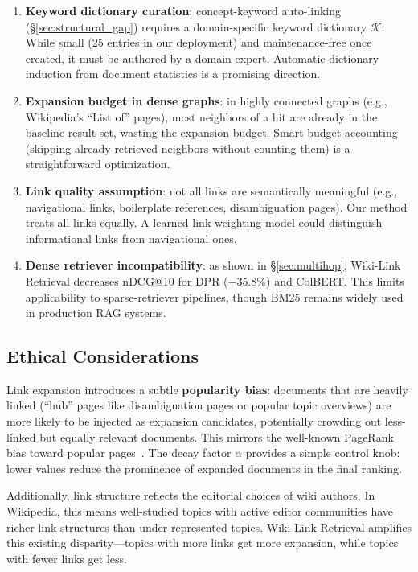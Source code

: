 \documentclass[sigconf,review]{acmart}
\newcommand{\sys}{Wiki-Link Retrieval\xspace}
\begin{document}
\begin{enumerate}
  \item \textbf{Keyword dictionary curation}: concept-keyword auto-linking (\S\ref{sec:structural_gap}) requires a domain-specific keyword dictionary $\mathcal{K}$.  While small (25 entries in our deployment) and maintenance-free once created, it must be authored by a domain expert.  Automatic dictionary induction from document statistics is a promising direction.
  \item \textbf{Expansion budget in dense graphs}: in highly connected graphs (e.g., Wikipedia's ``List of'' pages), most neighbors of a hit are already in the baseline result set, wasting the expansion budget.  Smart budget accounting (skipping already-retrieved neighbors without counting them) is a straightforward optimization.
  \item \textbf{Link quality assumption}: not all links are semantically meaningful (e.g., navigational links, boilerplate references, disambiguation pages).  Our method treats all links equally.  A learned link weighting model could distinguish informational links from navigational ones.
  \item \textbf{Dense retriever incompatibility}: as shown in \S\ref{sec:multihop}, \sys decreases nDCG@10 for DPR ($-$35.8\%) and ColBERT.  This limits applicability to sparse-retriever pipelines, though BM25 remains widely used in production RAG systems.
\end{enumerate}

\subsection{Ethical Considerations}

Link expansion introduces a subtle \textbf{popularity bias}: documents
that are heavily linked (``hub'' pages like disambiguation pages or
popular topic overviews) are more likely to be injected as expansion
candidates, potentially crowding out less-linked but equally relevant
documents.  This mirrors the well-known PageRank bias toward popular
pages~\citep{page1999pagerank}.  The decay factor $\alpha$ provides a
simple control knob: lower values reduce the prominence of expanded
documents in the final ranking.

Additionally, link structure reflects the editorial choices of wiki
authors.  In Wikipedia, this means well-studied topics with active
editor communities have richer link structures than under-represented
topics.  \sys amplifies this existing disparity---topics with more
links get more expansion, while topics with fewer links get less.
\end{document}
